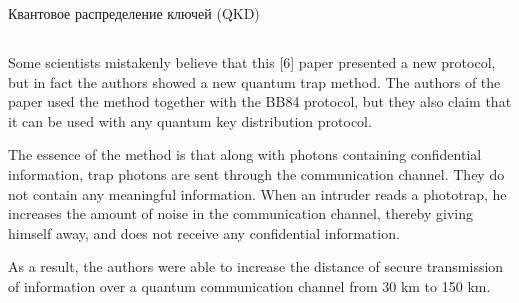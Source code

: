 Квантовое распределение ключей (QKD)

\subsection{\review}
Some scientists mistakenly believe that this [6] paper presented a new protocol, but in fact the authors showed a new quantum trap method. The authors of the paper used the method together with the BB84 protocol, but they also claim that it can be used with any quantum key distribution protocol.

The essence of the method is that along with photons containing confidential information, trap photons are sent through the communication channel. They do not contain any meaningful information. When an intruder reads a phototrap, he increases the amount of noise in the communication channel, thereby giving himself away, and does not receive any confidential information.

As a result, the authors were able to increase the distance of secure transmission of information over a quantum communication channel from 30 km to 150 km.


\subsection{\dic}
